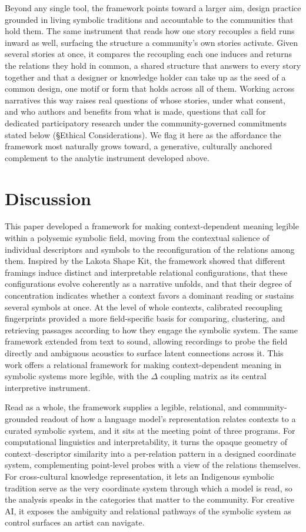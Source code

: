 \documentclass[final,creativeai]{article}
\begin{document}
Beyond any single tool, the framework points toward a larger aim, design practice grounded in living symbolic traditions and accountable to the communities that hold them. The same instrument that reads how one story recouples a field runs inward as well, surfacing the structure a community's own stories activate. Given several stories at once, it compares the recoupling each one induces and returns the relations they hold in common, a shared structure that answers to every story together and that a designer or knowledge holder can take up as the seed of a common design, one motif or form that holds across all of them. Working across narratives this way raises real questions of whose stories, under what consent, and who authors and benefits from what is made, questions that call for dedicated participatory research under the community-governed commitments stated below (\S Ethical Considerations). We flag it here as the affordance the framework most naturally grows toward, a generative, culturally anchored complement to the analytic instrument developed above.

\FloatBarrier
\section{Discussion}
\label{sec:discussion}
This paper developed a framework for making context-dependent meaning legible within a polysemic symbolic field, moving from the contextual salience of individual descriptors and symbols to the reconfiguration of the relations among them. Inspired by the Lakota Shape Kit, the framework showed that different framings induce distinct and interpretable relational configurations, that these configurations evolve coherently as a narrative unfolds, and that their degree of concentration indicates whether a context favors a dominant reading or sustains several symbols at once. At the level of whole contexts, calibrated recoupling fingerprints provided a more field-specific basis for comparing, clustering, and retrieving passages according to how they engage the symbolic system. The same framework extended from text to sound, allowing recordings to probe the field directly and ambiguous acoustics to surface latent connections across it. This work offers a relational framework for making context-dependent meaning in symbolic systems more legible, with the $\Delta$ coupling matrix as its central interpretive instrument.

Read as a whole, the framework supplies a legible, relational, and community-grounded readout of how a language model's representation relates contexts to a curated symbolic system, and it sits at the meeting point of three programs. For computational linguistics and interpretability, it turns the opaque geometry of context--descriptor similarity into a per-relation pattern in a designed coordinate system, complementing point-level probes with a view of the relations themselves. For cross-cultural knowledge representation, it lets an Indigenous symbolic tradition serve as the very coordinate system through which a model is read, so the analysis speaks in the categories that matter to the community. For creative AI, it exposes the ambiguity and relational pathways of the symbolic system as control surfaces an artist can navigate.
\end{document}
